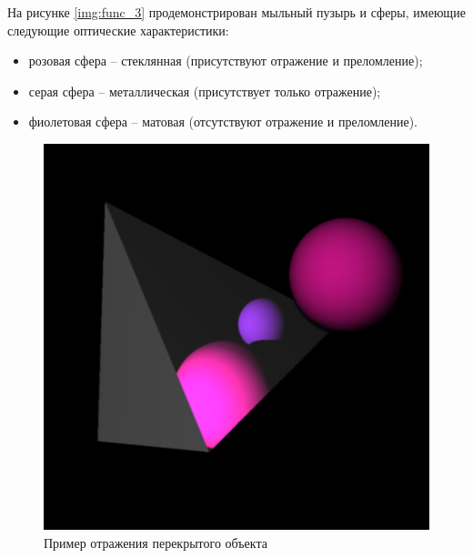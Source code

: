 На рисунке \ref{img:func_3} продемонстрирован мыльный пузырь и сферы, имеющие следующие оптические характеристики:
\begin{itemize}
	\item розовая сфера -- стеклянная (присутствуют отражение и преломление);
    \item серая сфера -- металлическая (присутствует только отражение);
    \item фиолетовая сфера -- матовая (отсутствуют отражение и преломление).
\end{itemize}

\begin{figure}[h]
	\begin{center}
		\includegraphics[width=0.9\linewidth]{img/func_1.png}
	\end{center}
	\captionsetup{justification=centering}
	\caption{Пример отражения перекрытого объекта}
	\label{img:func_1}
\end{figure}

